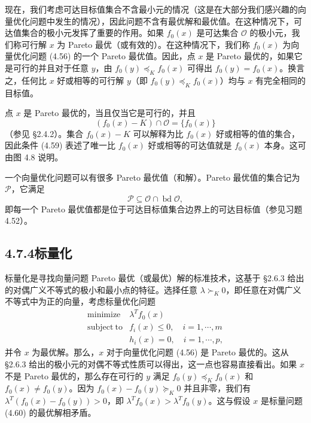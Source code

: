 \documentclass[UTF8,12pt,a4paper,fontset=fandol]{ctexart}
\begin{document}
现在，我们考虑可达目标值集合不含最小元的情况（这是在大部分我们感兴趣的向量优化问题中发生的情况），因此问题不含有最优解和最优值。在这种情况下，可达值集合的极小元发挥了重要的作用。如果 $f_0(x)$ 是可达集合 $\mathcal{O}$ 的极小元，我们称可行解 $x$ 为 Pareto 最优（或有效的）。在这种情况下，我们称 $f_0(x)$ 为向量优化问题 (4.56) 的一个 Pareto 最优值。因此，点 $x$ 是 Pareto 最优的，如果它是可行的并且对于任意 $y$，由 $f_0(y)\preceq_K f_0(x)$ 可得出 $f_0(y)=f_0(x)$。换言之，任何比 $x$ 好或相等的可行解 $y$（即 $f_0(y)\preceq_K f_0(x)$）均与 $x$ 有完全相同的目标值。

点 $x$ 是 Pareto 最优的，当且仅当它是可行的，并且
\begin{equation}
(f_0(x)-K)\cap\mathcal{O}=\{f_0(x)\}
\tag{4.59}
\end{equation}
（参见 \S 2.4.2）。集合 $f_0(x)-K$ 可以解释为比 $f_0(x)$ 好或相等的值的集合，因此条件 (4.59) 表述了唯一比 $f_0(x)$ 好或相等的可达值就是 $f_0(x)$ 本身。这可由图 4.8 说明。

一个向量优化问题可以有很多 Pareto 最优值（和解）。Pareto 最优值的集合记为 $\mathcal{P}$，它满足
\[
\mathcal{P}\subseteq \mathcal{O}\cap\operatorname{bd}\mathcal{O},
\]
即每一个 Pareto 最优值都是位于可达目标值集合边界上的可达目标值（参见习题 4.52）。

\subsection*{4.7.4\quad 标量化}

标量化是寻找向量问题 Pareto 最优（或最优）解的标准技术，这基于 \S 2.6.3 给出的对偶广义不等式的极小和最小点的特征。选择任意 $\lambda\succ_K 0$，即任意在对偶广义不等式中为正的向量，考虑标量优化问题
\begin{equation}
\begin{array}{ll}
\mathop{\mathrm{minimize}} & \lambda^Tf_0(x)\\
\mathrm{subject\ to} & f_i(x)\leq 0,\quad i=1,\cdots,m\\
& h_i(x)=0,\quad i=1,\cdots,p,
\end{array}
\tag{4.60}
\end{equation}
并令 $x$ 为最优解。那么，$x$ 对于向量优化问题 (4.56) 是 Pareto 最优的。这从 \S 2.6.3 给出的极小元的对偶不等式性质可以得出，这一点也容易直接看出。如果 $x$ 不是 Pareto 最优的，那么存在可行的 $y$ 满足 $f_0(y)\preceq_K f_0(x)$ 和 $f_0(x)\neq f_0(y)$。因为 $f_0(x)-f_0(y)\succeq_K 0$ 并且非零，我们有 $\lambda^T(f_0(x)-f_0(y))>0$，即 $\lambda^Tf_0(x)>\lambda^Tf_0(y)$。这与假设 $x$ 是标量问题 (4.60) 的最优解相矛盾。
\end{document}
